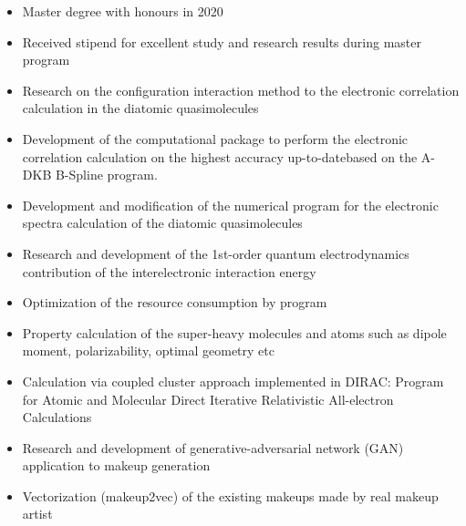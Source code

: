 
\begin{itemize}
    \item Master degree with honours in 2020
    \item Received stipend for excellent study and research results during master program
\end{itemize}






\begin{itemize}
\item Research on the configuration interaction method to the electronic correlation calculation in the diatomic quasimolecules
\item Development of the computational package to perform the electronic correlation calculation on the highest accuracy up-to-datebased on the A-DKB B-Spline program.
\end{itemize}

\begin{itemize}
\item Development and modification of the numerical program for the electronic spectra calculation of the diatomic quasimolecules
\item Research and development of the 1st-order quantum electrodynamics contribution of the interelectronic interaction energy
\item Optimization of the resource consumption by program
\end{itemize}

\begin{itemize}
\item Property calculation of the super-heavy molecules and atoms such as dipole moment, polarizability, optimal geometry etc
\item Calculation via coupled cluster approach implemented in DIRAC: Program for Atomic and Molecular Direct Iterative Relativistic All-electron Calculations
\end{itemize}

\divider

\begin{itemize}
\item Research and development of generative-adversarial network (GAN) application to makeup generation
\item Vectorization (makeup2vec) of the existing makeups made by real makeup artist
\end{itemize}

\cvproject{}